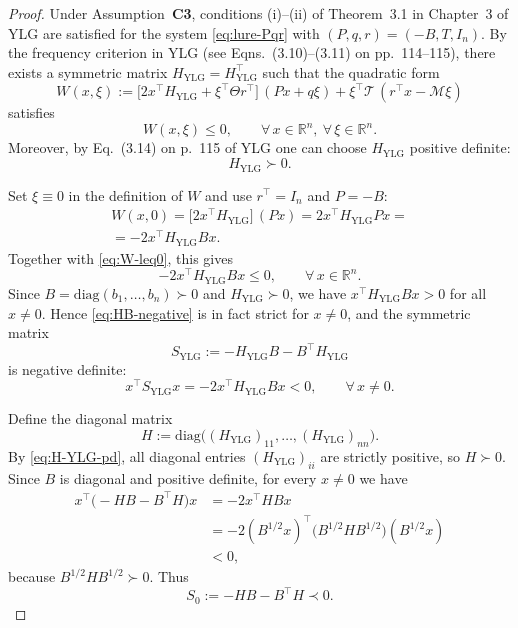 \documentclass[journal]{IEEEtran}
\newtheorem{proof}{Proof}
\begin{document}
\begin{proof}
Under Assumption~\textbf{C3}, conditions \textup{(i)}–\textup{(ii)}
of Theorem~3.1 in Chapter~3 of YLG are satisfied for the system
\eqref{eq:lure-Pqr} with $(P,q,r)=(-B,T,I_n)$.  By the frequency
criterion in YLG (see Eqns.~(3.10)–(3.11) on pp.~114–115), there
exists a symmetric matrix $H_{\mathrm{YLG}}=H_{\mathrm{YLG}}^{\top}$
such that the quadratic form
\[
  W(x,\xi)
  := \bigl[2x^{\top}H_{\mathrm{YLG}} + \xi^{\top}\Theta r^{\top}\bigr]\,
     (P x + q\xi)
     + \xi^{\top}\mathcal{T}\,(r^{\top}x - \mathcal{M}\xi)
\]
satisfies
\begin{equation}\label{eq:W-leq0}
  W(x,\xi) \le 0,
  \qquad \forall\,x\in\mathbb{R}^n,\ \forall\,\xi\in\mathbb{R}^n.
\end{equation}
Moreover, by Eq.~(3.14) on p.~115 of YLG one can choose
$H_{\mathrm{YLG}}$ positive definite:
\begin{equation}\label{eq:H-YLG-pd}
  H_{\mathrm{YLG}} \succ 0 .
\end{equation}

Set $\xi\equiv 0$ in the definition of $W$ and use $r^{\top}=I_n$ and
$P=-B$:
\begin{multline*}
  W(x,0)
   = \bigl[2x^{\top}H_{\mathrm{YLG}}\bigr]\,(P x)
   = 2x^{\top}H_{\mathrm{YLG}}P x = \\
   = -2x^{\top}H_{\mathrm{YLG}}B x .    
\end{multline*}
Together with \eqref{eq:W-leq0}, this gives
\begin{equation}\label{eq:HB-negative}
  -2x^{\top}H_{\mathrm{YLG}}B x \le 0,
  \qquad \forall\,x\in\mathbb{R}^n.
\end{equation}
Since $B=\mathrm{diag}(b_1,\dots,b_n)\succ 0$ and
$H_{\mathrm{YLG}}\succ 0$, we have $x^{\top}H_{\mathrm{YLG}}Bx>0$ for
all $x\neq 0$.  Hence \eqref{eq:HB-negative} is in fact strict for
$x\neq0$, and the symmetric matrix
\[
  S_{\mathrm{YLG}}
  := -H_{\mathrm{YLG}}B - B^{\top}H_{\mathrm{YLG}}
\]
is negative definite:
\begin{equation}\label{eq:SYLG-negative}
  x^{\top}S_{\mathrm{YLG}}x
  = -2x^{\top}H_{\mathrm{YLG}}B x < 0,
  \qquad \forall\,x\neq 0 .
\end{equation}

Define the diagonal matrix
\begin{equation}\label{eq:H-diag-def}
  H := \mathrm{diag}\bigl((H_{\mathrm{YLG}})_{11},
                         \dots,
                         (H_{\mathrm{YLG}})_{nn}\bigr).
\end{equation}
By \eqref{eq:H-YLG-pd}, all diagonal entries $(H_{\mathrm{YLG}})_{ii}$
are strictly positive, so $H\succ 0$.  Since $B$ is diagonal and
positive definite, for every $x\neq 0$ we have
\begin{align*}
  x^{\top}\bigl(-HB - B^{\top}H\bigr) x
    &= -2x^{\top}HBx \\
    &= -2(B^{1/2}x)^{\top}\bigl(B^{1/2}HB^{1/2}\bigr)(B^{1/2}x) \\
    &< 0,
\end{align*}
because $B^{1/2}HB^{1/2}\succ 0$.  Thus
\begin{equation}\label{eq:S0-negative}
  S_0 := -HB - B^{\top}H \prec 0 .
\end{equation}


\end{proof}
\end{document}
